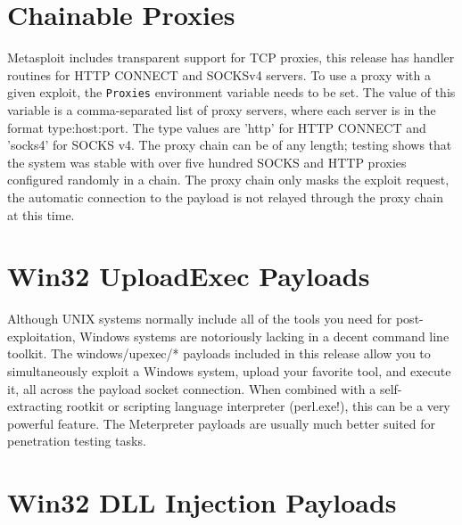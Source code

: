 \documentclass{report}
\begin{document}
\section{Chainable Proxies}

\par
Metasploit includes transparent support for TCP proxies, this release has
handler routines for HTTP CONNECT and SOCKSv4 servers. To use a proxy with a
given exploit, the \texttt{Proxies} environment variable needs to be set. The
value of this variable is a comma-separated list of proxy servers, where each
server is in the format type:host:port. The type values are 'http' for HTTP
CONNECT and 'socks4' for SOCKS v4. The proxy chain can be of any length; testing
shows that the system was stable with over five hundred SOCKS and HTTP proxies
configured randomly in a chain. The proxy chain only masks the exploit request,
the automatic connection to the payload is not relayed through the proxy chain
at this time.

\section{Win32 UploadExec Payloads}

\par
Although UNIX systems normally include all of the tools you need for
post-exploitation, Windows systems are notoriously lacking in a decent command
line toolkit. The windows/upexec/* payloads included in this release allow you
to simultaneously exploit a Windows system, upload your favorite tool, and
execute it, all across the payload socket connection. When combined with a
self-extracting rootkit or scripting language interpreter (perl.exe!), this can
be a very powerful feature. The Meterpreter payloads are usually much better
suited for penetration testing tasks.

\section{Win32 DLL Injection Payloads}
\end{document}

